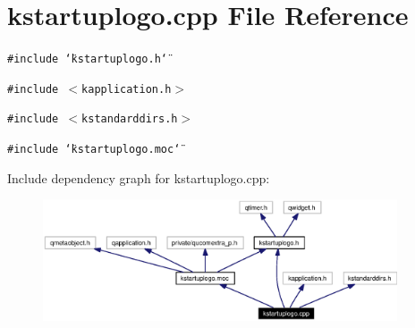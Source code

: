 \section{kstartuplogo.cpp File Reference}
\label{kstartuplogo_8cpp}


{\tt \#include \char`\"{}kstartuplogo.h\char`\"{}}\par
{\tt \#include $<$kapplication.h$>$}\par
{\tt \#include $<$kstandarddirs.h$>$}\par
{\tt \#include \char`\"{}kstartuplogo.moc\char`\"{}}\par


Include dependency graph for kstartuplogo.cpp:\begin{figure}[H]
\begin{center}
\leavevmode
\includegraphics[width=297pt]{kstartuplogo_8cpp__incl}
\end{center}
\end{figure}
